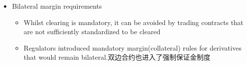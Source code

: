 \begin{itemize}
\begin{itemize}
\begin{itemize}
default fund) are depleted全部耗尽
\begin{itemize}
    \item Additional calls to the default fund
    \item Variation margin haircutting
    \item Selective tear-up of positions
\end{itemize}
\item CCPs provide a number of benefits:Allow netting of all trades executed through CCPs
\begin{itemize}
    \item CCPs manage margin requirements from their members to reduce the risk associated with the movement in the value of their underlying portfolios.
    \item The CCP absorbs the 'domino effect’by acting as a sort of financial shock absorber充当金融冲击吸收器来吸收"多米诺骨牌效应“(Auctioning the defaulted members' positions)
\end{itemize}
\end{itemize}
\end{itemize}

\item Bilateral margin requirements
\begin{itemize}
    \item Whilst clearing is mandatory, it can be avoided by trading contracts that are not sufficiently standardized to be cleared
    \item Regulators introduced mandatory margin(collateral) rules for derivatives that would remain bilateral.双边合约也进入了强制保证金制度
\end{itemize}




\end{itemize}
